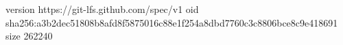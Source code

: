 version https://git-lfs.github.com/spec/v1
oid sha256:a3b2dec51808b8afd8f5875016c88e1f254a8dbd7760c3c8806bce8c9e418691
size 262240
